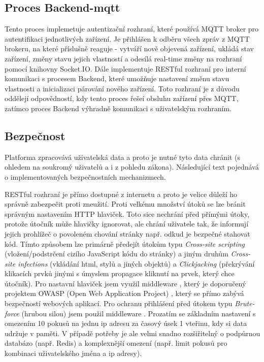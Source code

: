 \subsection{Proces Backend-mqtt}
Tento proces implemetuje autentizační rozhraní, které používá MQTT broker pro autentifikaci jednotlivých zařízení. Je přihlášen k odběru všech zpráv z MQTT brokeru, na které příslušně reaguje - vytváří nově objevená zařízení, ukládá stav zařízení, změny stavu jejich vlastností a odesílá real-time změny na rozhraní pomocí knihovny Socket.IO. Dále implementuje RESTful rozhraní pro interní komunikaci s procesem Backend, které umožňuje nastavení změnu stavu vlastnosti a inicializaci párování nového zařízení. Toto rozhraní je z důvodu oddělejí odpovědností, kdy tento proces řešeí obsluhu zařízení přes MQTT, zatímco proces Backend výhradně komunikaci s uživatelským rozhraním.


\subsection{Bezpečnost}
Platforma zpracovává uživatelská data a proto je nutné tyto data chránit (s ohledem na soukromý uživatelů a i z pohledu zákona). Následující text pojednává o implementovaných bezpečnostních mechanizmech.

RESTful rozhraní je přímo dostupné z internetu a proto je velice důleží ho správně zabezpečit proti zneužití. Proti velkému množství útoků se lze bránit správným nastavením HTTP hlaviček. Toto sice nechrání před přímými útoky, protože útočník může hlavičky ignorovat, ale chrání uživatele tak, že informují jejich prohlížeč o povoleném chování stránky např. odkud je bezpečné stahovat kód. Tímto způsobem lze primárně předejít útokům typu \textit{Cross-site scripting} (vložení/podstrčení cizího JavaScript kódu do stránky) a jiným druhům \textit{Cross-site infections} (vkládání html, stylů a jiných objektů) a \textit{Clickjacking} (překrývání klikacích prvků jinými s úmyslem propagace kliknutí na prvek, který chce útočník). Pro nastavní hlaviček jsem využil middleware , který je doporučený projektem OWASP (Open Web Application Project) \cite{owasp-cheatsheets}, který se přímo zabývá bezpečností webových aplikací. Pro ochranu přihlášení před útokem typu \textit{Brute-force} (hrubou silou) jsem použil middleware . Prozatím se základním nastavení s omezením 10 pokusů na jednu ip adresu za časový úsek 1 vteřinu, kdy si data udržuje v paměti. V případě potřeby je ale velmi snadno rozšiřitelný o podpůrnou databázo (např. Redis) a komplexnější omezení (např. limit pokusů pro kombinaci uživatelského jména a ip adresy).

